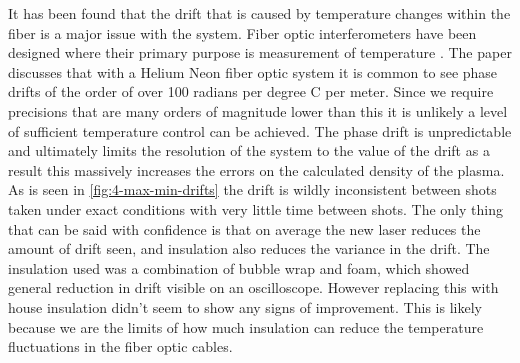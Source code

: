 \documentclass[12pt,a4paper,oneside]{report}
\begin{document}
It has been found that the drift that is caused by temperature changes within the fiber is a major issue with the system. Fiber optic interferometers have been designed where their primary purpose is measurement of temperature \cite{Hocker1979Fiber-opticTemperature}. The paper discusses that with a Helium Neon fiber optic system it is common to see phase drifts of the order of over 100 radians per degree C per meter. Since we require precisions that are many orders of magnitude lower than this it is unlikely a level of sufficient temperature control can be achieved. The phase drift is unpredictable and ultimately limits the resolution of the system to the value of the drift as a result this massively increases the errors on the calculated density of the plasma. As is seen in \autoref{fig:4-max-min-drifts} the drift is wildly inconsistent between shots taken under exact conditions with very little time between shots. The only thing that can be said with confidence is that on average the new laser reduces the amount of drift seen, and insulation also reduces the variance in the drift. The insulation used was a combination of bubble wrap and foam, which showed general reduction in drift visible on an oscilloscope. However replacing this with house insulation didn't seem to show any signs of improvement. This is likely because we are the limits of how much insulation can reduce the temperature fluctuations in the fiber optic cables.
\end{document}

